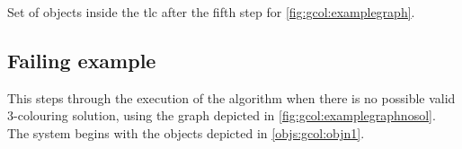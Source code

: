 \begin{cpobjectsfloat}
\begin{cpobjects}

    
    
    
            \cpobjectsline{\vdots}
            
    
\end{cpobjects}
\caption{\label{objs:gcol:obj6}Set of objects inside the \gls{tlc} after the fifth step for \cref{fig:gcol:examplegraph}.}
\end{cpobjectsfloat}


\subsection{\label{sec:gcol:examplefail}Failing example}
This  steps through the execution of the algorithm when there is no possible valid 3-colouring solution, using the graph depicted in \cref{fig:gcol:examplegraphnosol}.  The system begins with the objects depicted in \cref{objs:gcol:objn1}.

